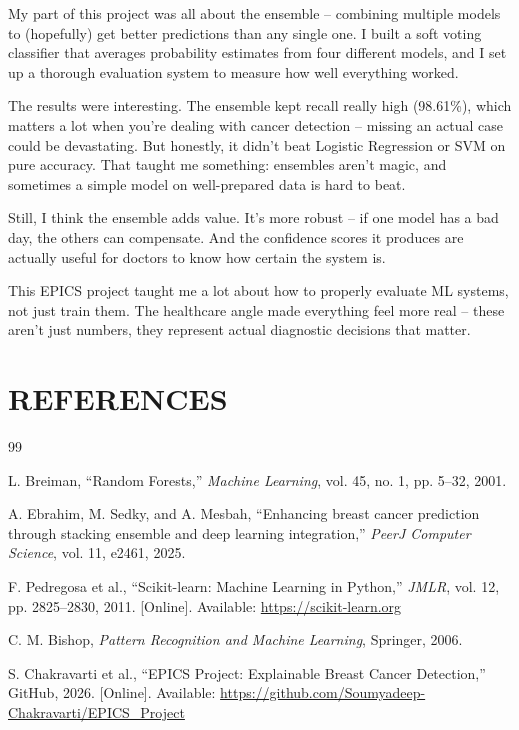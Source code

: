 \documentclass[12pt]{article}
\begin{document}
My part of this project was all about the ensemble -- combining multiple models to (hopefully) get better predictions than any single one. I built a soft voting classifier that averages probability estimates from four different models, and I set up a thorough evaluation system to measure how well everything worked.

The results were interesting. The ensemble kept recall really high (98.61\%), which matters a lot when you're dealing with cancer detection -- missing an actual case could be devastating. But honestly, it didn't beat Logistic Regression or SVM on pure accuracy. That taught me something: ensembles aren't magic, and sometimes a simple model on well-prepared data is hard to beat.

Still, I think the ensemble adds value. It's more robust -- if one model has a bad day, the others can compensate. And the confidence scores it produces are actually useful for doctors to know how certain the system is.

This EPICS project taught me a lot about how to properly evaluate ML systems, not just train them. The healthcare angle made everything feel more real -- these aren't just numbers, they represent actual diagnostic decisions that matter.

\newpage
\section{REFERENCES}

\begin{thebibliography}{99}

L. Breiman, ``Random Forests,'' \textit{Machine Learning}, vol. 45, no. 1, pp. 5--32, 2001.

A. Ebrahim, M. Sedky, and A. Mesbah, ``Enhancing breast cancer prediction through stacking ensemble and deep learning integration,'' \textit{PeerJ Computer Science}, vol. 11, e2461, 2025.

F. Pedregosa et al., ``Scikit-learn: Machine Learning in Python,'' \textit{JMLR}, vol. 12, pp. 2825--2830, 2011. [Online]. Available: \url{https://scikit-learn.org}

C. M. Bishop, \textit{Pattern Recognition and Machine Learning}, Springer, 2006.

S. Chakravarti et al., ``EPICS Project: Explainable Breast Cancer Detection,'' GitHub, 2026. [Online]. Available: \url{https://github.com/Soumyadeep-Chakravarti/EPICS_Project}

\end{thebibliography}
\end{document}
